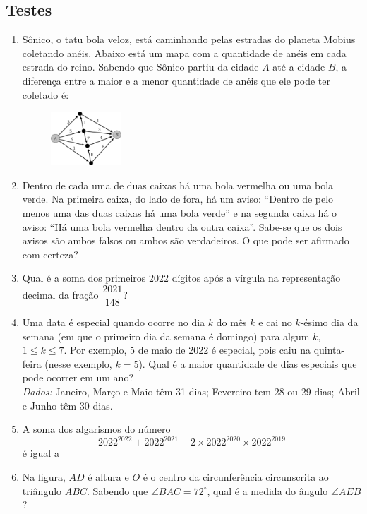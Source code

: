 \documentclass[12pt]{article}
\begin{document}
    \subsection{Testes}
      \begin{enumerate}[label=\textbf{\arabic*.}]
        \item Sônico, o tatu bola veloz, está caminhando pelas estradas do planeta Mobius coletando anéis. Abaixo está um mapa com a 
          quantidade de anéis em cada estrada do reino. Sabendo que Sônico partiu da cidade $A$ até a cidade $B$, a diferença entre a maior 
          e a menor quantidade de anéis que ele pode ter coletado é:
          \begin{figure}[h]
            \centering
            \includegraphics[width=0.25\textwidth]{first.png}
          \end{figure}
        \item Dentro de cada uma de duas caixas há uma bola vermelha ou uma bola verde. Na primeira caixa, do lado de fora, há um aviso:
          ``Dentro de pelo menos uma das duas caixas há uma bola verde'' e na segunda caixa há o aviso: ``Há uma bola vermelha dentro da outra 
          caixa''. Sabe-se que os dois avisos são ambos falsos ou ambos são verdadeiros. O que pode ser afirmado com certeza?
        \item Qual é a soma dos primeiros $2022$ dígitos após a vírgula na representação decimal da fração $\dfrac{2021}{148}$?
        \item Uma data é especial quando ocorre no dia $k$ do mês $k$ e cai no $k$-ésimo dia da semana (em que o primeiro dia da semana é 
          domingo) para algum $k$, $1 \le k \le 7$. Por exemplo, 5 de maio de 2022 é especial, pois caiu na quinta-feira (nesse exemplo, $k=5$).
          Qual é a maior quantidade de dias especiais que pode ocorrer em um ano? \\
          \textit{Dados:} Janeiro, Março e Maio têm 31 dias; Fevereiro tem 28 ou 29 dias; Abril e Junho têm 30 dias.
        \item A soma dos algarismos do número
          \[
            2022^{2022} + 2022^{2021} - 2 \times 2022^{2020} \times 2022^{2019}
          \]
          é igual a
        \item Na figura, $AD$ é altura e $O$ é o centro da circunferência circunscrita ao triângulo $ABC$. Sabendo que $\angle BAC = 72^\circ$, qual é a medida do ângulo $\angle AEB$?
          

\end{enumerate}
\end{document}
